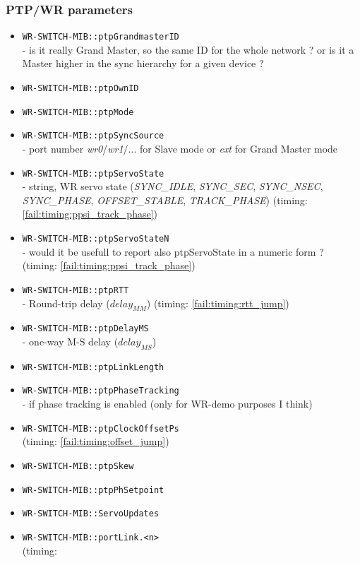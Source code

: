 \subsubsection{PTP/WR parameters}
\begin{itemize}[leftmargin=0pt]
	\item [] \texttt{WR-SWITCH-MIB::ptpGrandmasterID}\\ - is it really Grand
		Master, so the same ID for the whole network ? or is it a Master higher in
		the sync hierarchy for a given device ?
	\item [] \texttt{WR-SWITCH-MIB::ptpOwnID}
	\item [] \texttt{WR-SWITCH-MIB::ptpMode}
	\item [] \texttt{WR-SWITCH-MIB::ptpSyncSource}\\ - port number
		\emph{wr0}/\emph{wr1}/... for Slave mode or \emph{ext} for Grand Master mode
	\item [] \texttt{WR-SWITCH-MIB::ptpServoState}\\ - string, WR servo state
		(\emph{SYNC\_IDLE}, \emph{SYNC\_SEC}, \emph{SYNC\_NSEC}, \emph{SYNC\_PHASE},
		\emph{OFFSET\_STABLE}, \emph{TRACK\_PHASE}) (timing:
		\ref{fail:timing:ppsi_track_phase})
	\item [] \texttt{WR-SWITCH-MIB::ptpServoStateN}\\ - would it be usefull to
		report also ptpServoState in a numeric form ? (timing:
		\ref{fail:timing:ppsi_track_phase})
	\item [] \texttt{WR-SWITCH-MIB::ptpRTT}\\ - Round-trip delay ($delay_{MM}$)
		(timing: \ref{fail:timing:rtt_jump})
	\item [] \texttt{WR-SWITCH-MIB::ptpDelayMS}\\ - one-way M-S delay
		($delay_{MS}$)
	\item [] \texttt{WR-SWITCH-MIB::ptpLinkLength}
	\item [] \texttt{WR-SWITCH-MIB::ptpPhaseTracking}\\ - if phase tracking is
		enabled (only for WR-demo purposes I think)
	\item [] \texttt{WR-SWITCH-MIB::ptpClockOffsetPs}\\ (timing:
		\ref{fail:timing:offset_jump})
	\item [] \texttt{WR-SWITCH-MIB::ptpSkew}
	\item [] \texttt{WR-SWITCH-MIB::ptpPhSetpoint}
	\item [] \texttt{WR-SWITCH-MIB::ServoUpdates}
	\item [] \texttt{WR-SWITCH-MIB::portLink.<n>}\\ (timing:

\end{itemize}
